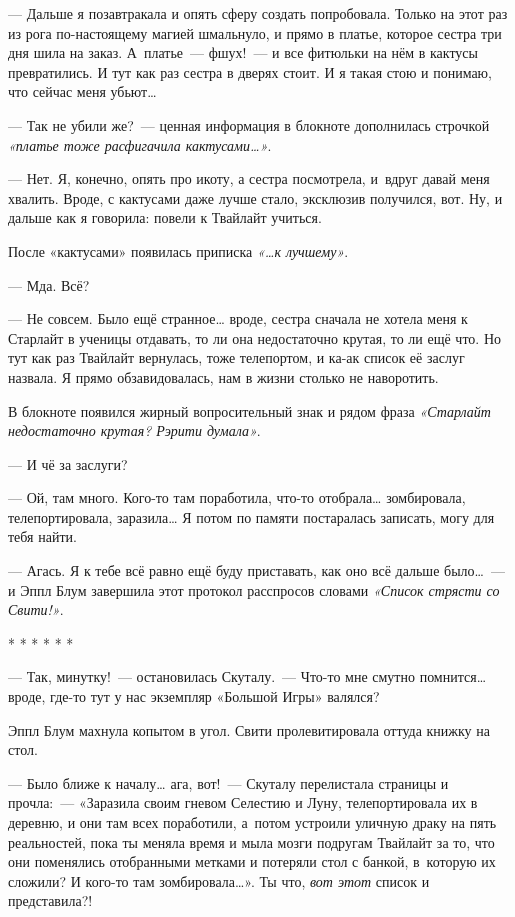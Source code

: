 \documentclass[fontsize=11pt,a5paper,titlepage=firstcover]{scrbook}
\begin{document}
--- Дальше я позавтракала и опять сферу создать попробовала. Только на этот раз из рога по-настоящему магией шмальнуло, и прямо в платье, которое сестра три дня шила на заказ. А~платье~--- фшух!~--- и все фитюльки на нём в кактусы превратились. И тут как раз сестра в дверях стоит. И я такая стою и понимаю, что сейчас меня убьют{\ldots}

--- Так не убили же?~--- ценная информация в блокноте дополнилась строчкой \emph{«платье тоже расфигачила кактусами{\ldots}»}.

--- Нет. Я, конечно, опять про икоту, а сестра посмотрела, и~вдруг давай меня хвалить. Вроде, с кактусами даже лучше стало, эксклюзив получился, вот. Ну, и дальше как я говорила: повели к Твайлайт учиться.

После «кактусами» появилась приписка \emph{«{\ldots}к лучшему»}.

--- Мда. Всё?

--- Не совсем. Было ещё странное{\ldots} вроде, сестра сначала не хотела меня к Старлайт в ученицы отдавать, то ли она недостаточно крутая, то ли ещё что. Но тут как раз Твайлайт вернулась, тоже телепортом, и ка-ак список её заслуг назвала. Я прямо обзавидовалась, нам в жизни столько не наворотить.

В блокноте появился жирный вопросительный знак и рядом фраза \emph{«Старлайт недостаточно крутая? Рэрити думала»}.

--- И чё за заслуги?

--- Ой, там много. Кого-то там поработила, что-то отобрала{\ldots} зомбировала, телепортировала, заразила{\ldots} Я потом по памяти постаралась записать, могу для тебя найти.

--- Агась. Я к тебе всё равно ещё буду приставать, как оно всё дальше было{\ldots}~--- и Эппл Блум завершила этот протокол расспросов словами \emph{«Список стрясти со Свити!»}.
\begin{center}* * * * * *\end{center}


--- Так, минутку!~--- остановилась Скуталу.~--- Что-то мне смутно помнится{\ldots} вроде, где-то тут у нас экземпляр «Большой Игры» валялся?

Эппл Блум махнула копытом в угол. Свити пролевитировала оттуда книжку на стол.

--- Было ближе к началу{\ldots} ага, вот!~--- Скуталу перелистала страницы и прочла:~--- «Заразила своим гневом Селестию и Луну, телепортировала их в деревню, и они там всех поработили, а~потом устроили уличную драку на пять реальностей, пока ты меняла время и мыла мозги подругам Твайлайт за то, что они поменялись отобранными метками и потеряли стол с банкой, в~которую их сложили? И кого-то там зомбировала{\ldots}». Ты что, \emph{вот этот} список и представила?!
\end{document}
